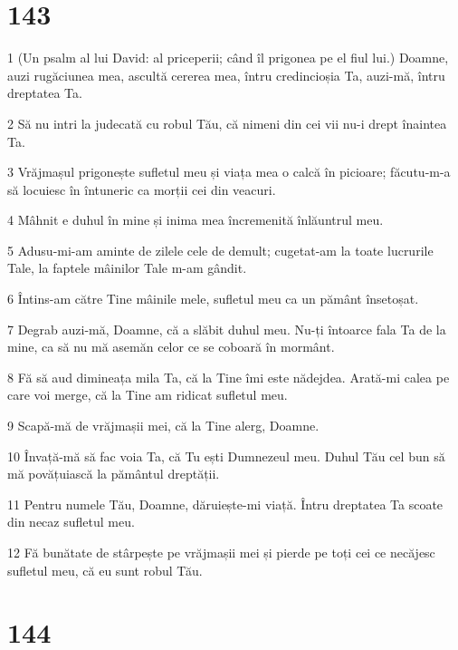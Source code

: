 \chapter{143}

\par 1 (Un psalm al lui David: al priceperii; când îl prigonea pe el fiul lui.) Doamne, auzi rugăciunea mea, ascultă cererea mea, întru credincioșia Ta, auzi-mă, întru dreptatea Ta.
\par 2 Să nu intri la judecată cu robul Tău, că nimeni din cei vii nu-i drept înaintea Ta.
\par 3 Vrăjmașul prigonește sufletul meu și viața mea o calcă în picioare; făcutu-m-a să locuiesc în întuneric ca morții cei din veacuri.
\par 4 Mâhnit e duhul în mine și inima mea încremenită înlăuntrul meu.
\par 5 Adusu-mi-am aminte de zilele cele de demult; cugetat-am la toate lucrurile Tale, la faptele mâinilor Tale m-am gândit.
\par 6 Întins-am către Tine mâinile mele, sufletul meu ca un pământ însetoșat.
\par 7 Degrab auzi-mă, Doamne, că a slăbit duhul meu. Nu-ți întoarce fala Ta de la mine, ca să nu mă asemăn celor ce se coboară în mormânt.
\par 8 Fă să aud dimineața mila Ta, că la Tine îmi este nădejdea. Arată-mi calea pe care voi merge, că la Tine am ridicat sufletul meu.
\par 9 Scapă-mă de vrăjmașii mei, că la Tine alerg, Doamne.
\par 10 Învață-mă să fac voia Ta, că Tu ești Dumnezeul meu. Duhul Tău cel bun să mă povățuiască la pământul dreptății.
\par 11 Pentru numele Tău, Doamne, dăruiește-mi viață. Întru dreptatea Ta scoate din necaz sufletul meu.
\par 12 Fă bunătate de stârpește pe vrăjmașii mei și pierde pe toți cei ce necăjesc sufletul meu, că eu sunt robul Tău.

\chapter{144}

